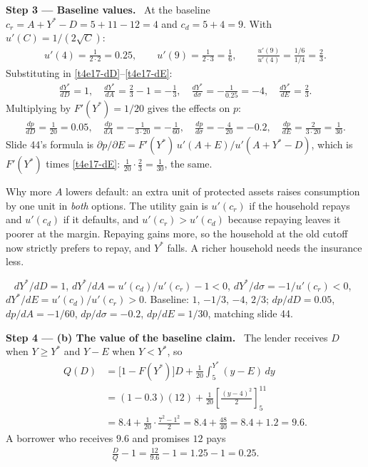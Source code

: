 \documentclass[11pt,a4paper]{article}
\newcommand{\step}[2]{\par\medskip\noindent\textbf{Step #1 --- #2.}~}
\newcommand{\answer}[1]{\par\smallskip\noindent\fbox{\textbf{Answer #1.}}~}
\begin{document}
\step{3}{Baseline values} At the baseline $c_r=A+Y^*-D=5+11-12=4$ and $c_d=5+4=9$. With $u'(C)=1/(2\sqrt C)$:
\begin{align}
  u'(4)=\frac{1}{2\cdot 2}=0.25,\qquad u'(9)=\frac{1}{2\cdot 3}=\frac16,\qquad \frac{u'(9)}{u'(4)}=\frac{1/6}{1/4}=\frac23. \label{t4e17-ratio}
\end{align}
Substituting in \eqref{t4e17-dD}--\eqref{t4e17-dE}:
\begin{align}
  \frac{dY^*}{dD}=1,\quad \frac{dY^*}{dA}=\frac23-1=-\frac13,\quad \frac{dY^*}{d\sigma}=-\frac{1}{0.25}=-4,\quad \frac{dY^*}{dE}=\frac23. \nonumber
\end{align}
Multiplying by $F'(Y^*)=1/20$ gives the effects on $p$:
\begin{align}
  \frac{dp}{dD}=\frac{1}{20}=0.05,\quad \frac{dp}{dA}=-\frac{1}{3\cdot 20}=-\frac{1}{60},\quad
  \frac{dp}{d\sigma}=-\frac{4}{20}=-0.2,\quad \frac{dp}{dE}=\frac{2}{3\cdot 20}=\frac{1}{30}. \label{t4e17-dp}
\end{align}
Slide 44's formula is $\partial p/\partial E=F'(Y^*)\,u'(A+E)/u'(A+Y^*-D)$, which is $F'(Y^*)$ times
\eqref{t4e17-dE}: $\tfrac1{20}\cdot\tfrac23=\tfrac1{30}$, the same.

Why more $A$ lowers default: an extra unit of protected assets raises consumption by one unit in \emph{both}
options. The utility gain is $u'(c_r)$ if the household repays and $u'(c_d)$ if it defaults, and
$u'(c_r)>u'(c_d)$ because repaying leaves it poorer at the margin. Repaying gains more, so the household at the
old cutoff now strictly prefers to repay, and $Y^*$ falls. A richer household needs the insurance less.

\answer{(a)} $dY^*/dD=1$, $dY^*/dA=u'(c_d)/u'(c_r)-1<0$, $dY^*/d\sigma=-1/u'(c_r)<0$,
$dY^*/dE=u'(c_d)/u'(c_r)>0$. Baseline: $1$, $-1/3$, $-4$, $2/3$; $dp/dD=0.05$, $dp/dA=-1/60$,
$dp/d\sigma=-0.2$, $dp/dE=1/30$, matching slide 44.

\step{4}{(b) The value of the baseline claim} The lender receives $D$ when $Y\ge Y^*$ and $Y-E$ when $Y<Y^*$, so
\begin{align}
  Q(D) &= \big[1-F(Y^*)\big]D + \frac1{20}\int_5^{Y^*}(y-E)\,dy \label{t4e17-Q}\\
       &= (1-0.3)(12) + \frac1{20}\left[\frac{(y-4)^2}{2}\right]_5^{11} \nonumber\\
       &= 8.4 + \frac1{20}\cdot\frac{7^2-1^2}{2} = 8.4+\frac{48}{40} = 8.4+1.2 = 9.6. \nonumber
\end{align}
A borrower who receives $9.6$ and promises $12$ pays
\begin{align}
  \frac{D}{Q}-1 = \frac{12}{9.6}-1 = 1.25-1 = 0.25. \label{t4e17-rate}
\end{align}
\end{document}
